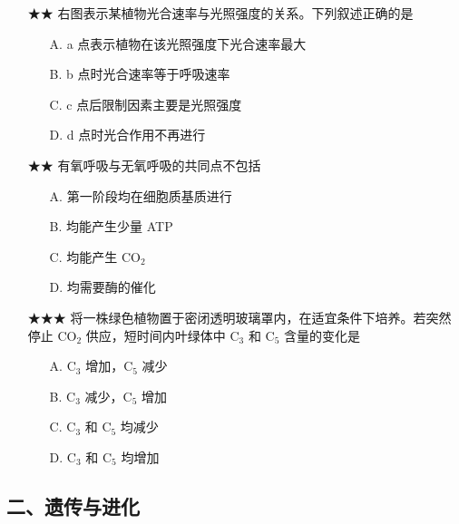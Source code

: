 \begin{enumerate}
  \item[★★] 右图表示某植物光合速率与光照强度的关系。下列叙述正确的是
  \begin{enumerate}
    \item[A.] a 点表示植物在该光照强度下光合速率最大
    \item[B.] b 点时光合速率等于呼吸速率
    \item[C.] c 点后限制因素主要是光照强度
    \item[D.] d 点时光合作用不再进行
  \end{enumerate}
  \vspace{0.8cm}

  \item[★★] 有氧呼吸与无氧呼吸的共同点不包括
  \begin{enumerate}
    \item[A.] 第一阶段均在细胞质基质进行
    \item[B.] 均能产生少量 ATP
    \item[C.] 均能产生 CO$_2$
    \item[D.] 均需要酶的催化
  \end{enumerate}
  \vspace{0.8cm}

  \item[★★★] 将一株绿色植物置于密闭透明玻璃罩内，在适宜条件下培养。若突然停止 CO$_2$ 供应，短时间内叶绿体中 C$_3$ 和 C$_5$ 含量的变化是
  \begin{enumerate}
    \item[A.] C$_3$ 增加，C$_5$ 减少
    \item[B.] C$_3$ 减少，C$_5$ 增加
    \item[C.] C$_3$ 和 C$_5$ 均减少
    \item[D.] C$_3$ 和 C$_5$ 均增加
  \end{enumerate}
  \vspace{1cm}
\end{enumerate}

\subsection{二、遗传与进化}

